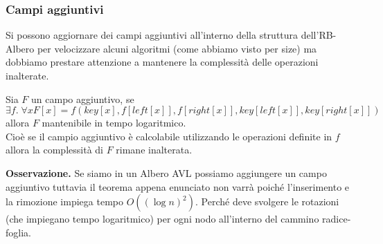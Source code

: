\documentclass[a4paper]{article}
\begin{document}
\subsubsection{Campi aggiuntivi}
Si possono aggiornare dei campi aggiuntivi all'interno della struttura dell'RB-Albero per velocizzare alcuni algoritmi (come abbiamo visto per size)
ma dobbiamo prestare attenzione a mantenere la complessità delle operazioni inalterate.
\begin{theorem}
  Sia $F$ un campo aggiuntivo, se 
  \[\exists f. \; \forall x F[x] = f(key[x], f[left[x]], f[right[x]], key[left[x]], key[right[x]])\]
  allora $F$ mantenibile in tempo logaritmico. 
  \\
  Cioè se il campio aggiuntivo è calcolabile utilizzando le operazioni definite in $f$ allora la complessità di $F$ rimane inalterata.
\end{theorem}
\textbf{Osservazione. } Se siamo in un Albero AVL possiamo aggiungere un campo aggiuntivo tuttavia il teorema appena enunciato non varrà poiché l'inserimento e la rimozione impiega tempo $O((\log n)^2)$.
Perché deve svolgere le rotazioni (che impiegano tempo logaritmico) per ogni nodo all'interno del cammino radice-foglia.
\end{document}
